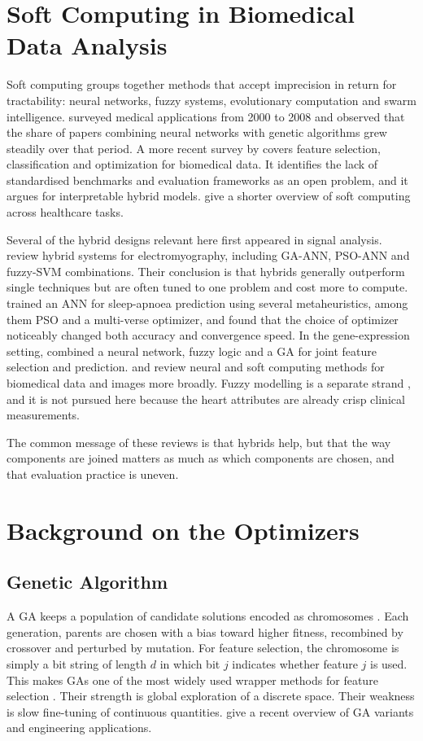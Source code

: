 \documentclass[MTech]{ugthesis}
\begin{document}
\section{Soft Computing in Biomedical Data Analysis}
Soft computing groups together methods that accept imprecision in return for tractability: neural networks, fuzzy systems, evolutionary computation and swarm intelligence. \citet{yardimci2009medicine} surveyed medical applications from 2000 to 2008 and observed that the share of papers combining neural networks with genetic algorithms grew steadily over that period. A more recent survey by \citet{houssein2023softcomputing} covers feature selection, classification and optimization for biomedical data. It identifies the lack of standardised benchmarks and evaluation frameworks as an open problem, and it argues for interpretable hybrid models. \citet{sadiku2022essence} give a shorter overview of soft computing across healthcare tasks.

Several of the hybrid designs relevant here first appeared in signal analysis. \citet{xie2014emg} review hybrid systems for electromyography, including GA-ANN, PSO-ANN and fuzzy-SVM combinations. Their conclusion is that hybrids generally outperform single techniques but are often tuned to one problem and cost more to compute. \citet{chyad2022apnea} trained an ANN for sleep-apnoea prediction using several metaheuristics, among them PSO and a multi-verse optimizer, and found that the choice of optimizer noticeably changed both accuracy and convergence speed. In the gene-expression setting, \citet{iqbal2019infg} combined a neural network, fuzzy logic and a GA for joint feature selection and prediction. \citet{weiss2022nn} and \citet{devi2021imaging} review neural and soft computing methods for biomedical data and images more broadly. Fuzzy modelling is a separate strand \citep{chicco2023fuzzy}, and it is not pursued here because the heart attributes are already crisp clinical measurements.

The common message of these reviews is that hybrids help, but that the way components are joined matters as much as which components are chosen, and that evaluation practice is uneven.

\section{Background on the Optimizers}
\subsection{Genetic Algorithm}
A GA keeps a population of candidate solutions encoded as chromosomes \citep{holland1975,goldberg1989}. Each generation, parents are chosen with a bias toward higher fitness, recombined by crossover and perturbed by mutation. For feature selection, the chromosome is simply a bit string of length $d$ in which bit $j$ indicates whether feature $j$ is used. This makes GAs one of the most widely used wrapper methods for feature selection \citep{xue2016fssurvey}. Their strength is global exploration of a discrete space. Their weakness is slow fine-tuning of continuous quantities. \citet{slowik2020ea} give a recent overview of GA variants and engineering applications.
\end{document}
